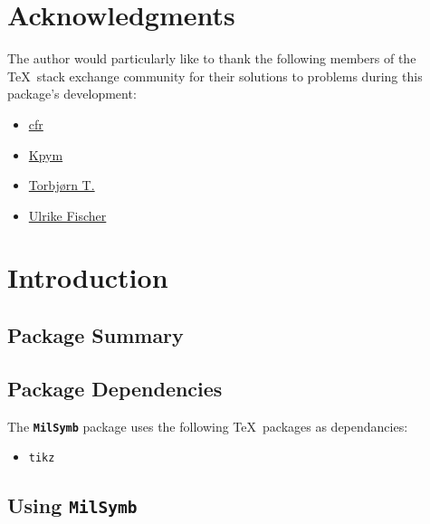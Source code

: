 \documentclass[a4paper, titlepage]{article}
\newcommand\MilSymb{\textbf{\texttt{MilSymb}} }
\begin{document}
\clearpage

\begin{versionhistory}
\renewcommand \vhAuthorColWidth{6cm}
\end{versionhistory}

\clearpage

\section*{Acknowledgments}

The author would particularly like to thank the following members of the \TeX\  stack exchange community for their solutions to problems during this package\rq{}s development:

\begin{itemize}
\item \href{https://tex.stackexchange.com/users/39222}{cfr}
\item \href{https://tex.stackexchange.com/users/9335}{Kpym}
\item \href{https://tex.stackexchange.com/users/586}{Torbj\o rn T.}
\item \href{https://tex.stackexchange.com/users/2388}{Ulrike Fischer}
\end{itemize}

\clearpage

\tableofcontents

\clearpage

\section{Introduction}

\subsection{Package Summary}

\subsection{Package Dependencies}

The \MilSymb package uses the following \TeX\ packages as dependancies:

\begin{itemize}
\item \texttt{tikz}
\end{itemize}

\subsection{Using \MilSymb}
\end{document}
